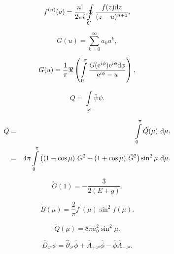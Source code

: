 \documentclass[]{article}
\begin{document}
\begin{equation}
	f^{(n)}(a) = \frac{n!}{2 \pi i} \oint\limits_{C}
	\frac{f(z){\rm d} z}{(z-u)^{n+1}},
\end{equation}

\begin{equation}
	G(u) = \sum\limits_{k=0}^\infty a_k u^k,
\end{equation}

\begin{equation}
	G(u) = \frac{1}{\pi} \Re \left( 
	\int\limits_{0}^{\pi} \frac{G({\rm e}^{i \phi})
		{\rm e}^{i \phi} {\rm d} \phi}
	{{\rm e}^{i \phi} - u}
	\right), 
\end{equation}



\begin{equation}
	Q = \int\limits_{S^3} {\bar \psi} \psi.
\end{equation}

\begin{eqnarray}
	\label{Qtilde}
	Q  &=& \int\limits_{0}^{\pi} {\tilde Q}(\mu)~ {\rm d} \mu,\\
	\label{Qtilde2}
	&=& 4 \pi \int\limits_{0}^{\pi} \left(
	(1-\cos\mu)~G^2 + 
	(1+\cos \mu)~{\tilde G}^2
	\right)
	\sin^2 \mu~ {\rm d} \mu.
\end{eqnarray}

\begin{equation}
	\label{bc}
	{\tilde G}(1) = -\frac{3}{2(E+g)}.
\end{equation}

\begin{equation}
	{\tilde B}(\mu) = \frac{2}{\pi} f^\prime(\mu) \sin^2 f(\mu).
\end{equation}

\begin{equation}
	{\tilde Q}(\mu) = 8 \pi a_0^2 \sin^2 \mu.
\end{equation}








\begin{equation}\label{eq:cdo}
\hat{D}_{z^a}\phi = \hat{\partial}_{z^a}\hat{\phi}+
\hat{A}_{+z^a}\hat{\phi}-\hat{\phi}\hat{A}_{-z^a}.
\end{equation}
\end{document}
